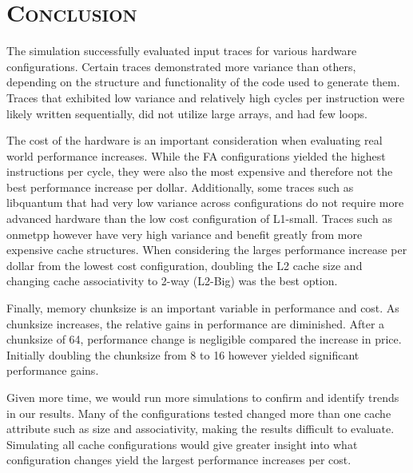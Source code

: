 \documentclass[FinalReport.tex]{subfiles}
\begin{document}
\bigskip

\newpage
\section*{\textsc{\Large Conclusion}}

The simulation successfully evaluated input traces for various hardware configurations.  Certain traces demonstrated more variance than others, depending on the structure and functionality of the code used to generate them.  Traces that exhibited low variance and relatively high cycles per instruction were likely written sequentially, did not utilize large arrays, and had few loops.  

	The cost of the hardware is an important consideration when evaluating real world performance increases.  While the FA configurations yielded the highest instructions per cycle, they were also the most expensive and therefore not the best performance increase per dollar.  Additionally, some traces such as libquantum that had very low variance across configurations do not require more advanced hardware than the low cost configuration of L1-small.  Traces such as onmetpp however have very high variance and benefit greatly from more expensive cache structures.  When considering the larges performance increase per dollar from the lowest cost configuration, doubling the L2 cache size and changing cache associativity to 2-way (L2-Big) was the best option.  
	
	Finally, memory chunksize is an important variable in performance and cost.  As chunksize increases, the relative gains in performance are diminished.  After a chunksize of 64, performance change is negligible compared the increase in price.  Initially doubling the chunksize from 8 to 16 however yielded significant performance gains.
	
	Given more time, we would run more simulations to confirm and identify trends in our results.  Many of the configurations tested changed more than one cache attribute such as size and associativity, making the results difficult to evaluate. Simulating all cache configurations would give greater insight into what configuration changes yield the largest performance increases per cost.  
\end{document}
